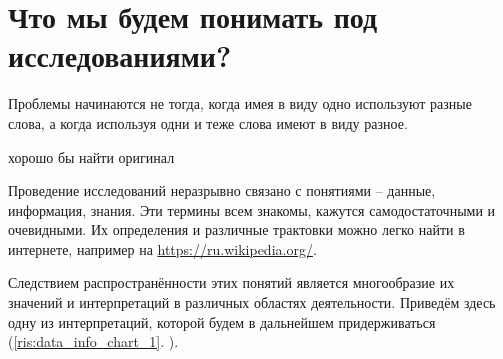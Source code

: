 
\section{Что мы будем понимать под исследованиями?}


\epigraph{Проблемы начинаются не тогда, когда имея в виду одно используют разные слова, а когда используя одни и теже слова имеют в виду разное.}{хорошо бы найти оригинал}

Проведение исследований неразрывно связано с понятиями -- данные, информация, знания. Эти термины всем знакомы, кажутся самодостаточными и очевидными. Их определения и различные трактовки можно легко найти в интернете, например на \url{https://ru.wikipedia.org/}.


Следствием распространённости этих понятий является многообразие их значений и интерпретаций в различных областях деятельности. Приведём здесь одну из интерпретаций, которой будем в дальнейшем придерживаться (\ref{ris:data_info_chart_1}. ). 

